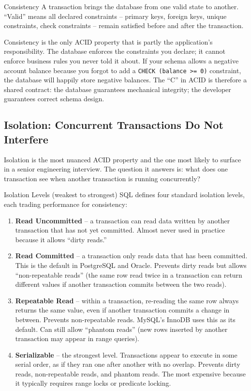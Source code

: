 \documentclass[11pt,a4paper]{article}
\begin{document}
\begin{termbox}{Consistency}
A transaction brings the database from one valid state to another. ``Valid'' means all declared constraints -- primary keys, foreign keys, unique constraints, check constraints -- remain satisfied before and after the transaction.
\end{termbox}

Consistency is the only ACID property that is partly the application's responsibility. The database enforces the constraints you declare; it cannot enforce business rules you never told it about. If your schema allows a negative account balance because you forgot to add a \texttt{CHECK (balance >= 0)} constraint, the database will happily store negative balances. The ``C'' in ACID is therefore a shared contract: the database guarantees mechanical integrity; the developer guarantees correct schema design.

\subsection{Isolation: Concurrent Transactions Do Not Interfere}

Isolation is the most nuanced ACID property and the one most likely to surface in a senior engineering interview. The question it answers is: what does one transaction see when another transaction is running concurrently?

\begin{termbox}{Isolation Levels (weakest to strongest)}
SQL defines four standard isolation levels, each trading performance for consistency:

\begin{enumerate}[leftmargin=*, itemsep=2pt]
  \item \textbf{Read Uncommitted} -- a transaction can read data written by another transaction that has not yet committed. Almost never used in practice because it allows ``dirty reads.''
  \item \textbf{Read Committed} -- a transaction only reads data that has been committed. This is the default in PostgreSQL and Oracle. Prevents dirty reads but allows ``non-repeatable reads'' (the same row read twice in a transaction can return different values if another transaction commits between the two reads).
  \item \textbf{Repeatable Read} -- within a transaction, re-reading the same row always returns the same value, even if another transaction commits a change in between. Prevents non-repeatable reads. MySQL's InnoDB uses this as its default. Can still allow ``phantom reads'' (new rows inserted by another transaction may appear in range queries).
  \item \textbf{Serializable} -- the strongest level. Transactions appear to execute in some serial order, as if they ran one after another with no overlap. Prevents dirty reads, non-repeatable reads, and phantom reads. The most expensive because it typically requires range locks or predicate locking.
\end{enumerate}
\end{termbox}
\end{document}
